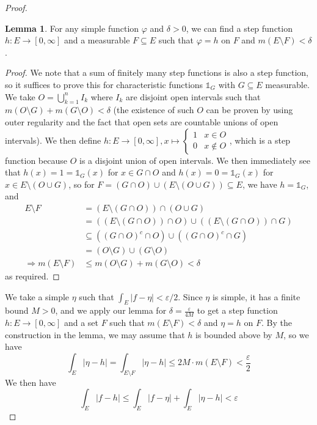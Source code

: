 \documentclass{article}
\newcommand{\longimplies}{\Longrightarrow}
\theoremstyle{definition} %
\numberwithin{thm}{section} %
\newtheorem{lemma}[thm]{Lemma}
\theoremstyle{definition} %
\begin{document}
\begin{proof}
\begin{lemma}
For any simple function $\varphi$ and $\delta > 0$, we can find a step function $h: E \to [0, \infty]$ and a measurable $F \subseteq E$ such that $\varphi = h$ on $F$ and $m(E \setminus F) < \delta$.
\end{lemma}
\begin{proof}
We note that a sum of finitely many step functions is also a step function, so it suffices to prove this for characteristic functions $\mathds{1}_G$ with $G \subseteq E$ measurable. We take $O = \bigcup_{k = 1}^n I_k$ where $I_k$ are disjoint open intervals such that $m(O \setminus G) + m(G \setminus O) < \delta$ (the existence of such $O$ can be proven by using outer regularity and the fact that open sets are countable unions of open intervals). We then define $h: E \to [0, \infty], x \mapsto \begin{cases}
    1 & x \in O \\ 0 & x \notin O
\end{cases}$, which is a step function because $O$ is a disjoint union of open intervals. We then immediately see that $h(x) = 1 = \mathds{1}_G(x)$ for $x \in G \cap O$ and $h(x) = 0 = \mathds{1}_G(x)$ for $x \in E \setminus (O \cup G)$, so for $F = (G \cap O) \cup (E \setminus (O \cup G)) \subseteq E$, we have $h = \mathds{1}_G$, and 
\begin{align*}
    E \setminus F 
    &= (E \setminus (G \cap O)) \cap (O \cup G) \\
    &= ((E \setminus (G \cap O)) \cap O) \cup ((E \setminus (G \cap O)) \cap G) \\
    &\subseteq ((G \cap O)^c \cap O) \cup ((G \cap O)^c \cap G) \\
    &= (O \setminus G) \cup (G \setminus O) \\
    \longimplies m(E \setminus F) 
    &\leq m(O \setminus G) + m(G \setminus O) < \delta
\end{align*}
as required.
\end{proof}
We take a simple $\eta$ such that $\int_E |f - \eta| < \varepsilon / 2$. Since $\eta$ is simple, it has a finite bound $M > 0$, and we apply our lemma for $\delta = \frac{\varepsilon}{4M}$ to get a step function $h: E \to [0, \infty]$ and a set $F$ such that $m(E \setminus F) < \delta$ and $\eta = h$ on $F$. By the construction in the lemma, we may assume that $h$ is bounded above by $M$, so we have 
\[ \int_E |\eta - h| = \int_{E \setminus F} |\eta - h| \leq 2M \cdot m(E \setminus F) < \frac{\varepsilon}{2} \]
We then have 
\[ \int_E |f - h| \leq \int_E |f - \eta| + \int_E |\eta - h| < \varepsilon \]
\end{proof}
\end{document}
